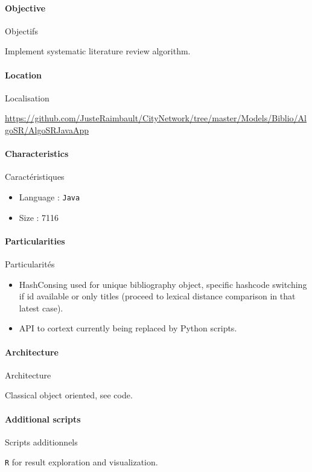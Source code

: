 \paragraph{Objective}{Objectifs}

Implement systematic literature review algorithm.

\paragraph{Location}{Localisation}

\url{https://github.com/JusteRaimbault/CityNetwork/tree/master/Models/Biblio/AlgoSR/AlgoSRJavaApp}

\paragraph{Characteristics}{Caractéristiques}

\begin{itemize}
\item Language : \texttt{Java}
\item Size : 7116
\end{itemize}

\paragraph{Particularities}{Particularités}

\begin{itemize}
\item HashConsing used for unique bibliography object, specific hashcode switching if id available or only titles (proceed to lexical distance comparison in that latest case).
\item API to cortext currently being replaced by Python scripts.
\end{itemize}

\paragraph{Architecture}{Architecture}

Classical object oriented, see code.

\paragraph{Additional scripts}{Scripts additionnels}

\texttt{R} for result exploration and visualization.

